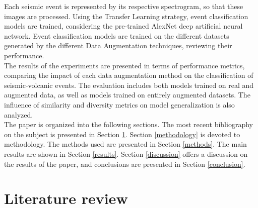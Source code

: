 \documentclass[journal]{IEEEtran}
\begin{document}
Each seismic event is represented by its respective spectrogram, so that these images are processed. Using the Transfer Learning strategy, event classification models are trained, considering the pre-trained AlexNet deep artificial neural network.
Event classification models are trained on the different datasets generated by the different Data Augmentation techniques, reviewing their performance.\\
The results of the experiments are presented in terms of performance metrics, comparing the impact of each data augmentation method on the classification of seismic-volcanic events. The evaluation includes both models trained on real and augmented data, as well as models trained on entirely augmented datasets. The influence of similarity and diversity metrics on model generalization is also analyzed.\\
The paper is organized into the following sections. The most recent bibliography on the subject is presented in Section \ref{literaturereview}. Section \ref{methodology} is devoted to methodology. The methods used are presented in Section \ref{methods}. The main results are shown in Section \ref{results}. Section \ref{discussion} offers a discussion on the results of the paper, and conclusions are presented in Section \ref{conclusion}.

\section{Literature review} \label{literaturereview}
\end{document}
